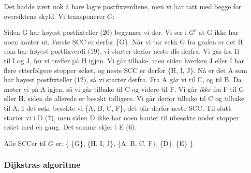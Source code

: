 \begin{example}
\noindent Det hadde vært nok å bare lagre postfixverdiene, men vi har tatt med begge for oversiktens skyld. Vi transponerer $ G $:

\begin{figure}[H]
\centering
{}
\end{figure}

Siden G har høyest postfixteller (20) begynner vi der. Vi ser i $ G^t $ at G ikke har noen kanter ut. Første SCC er derfor \{G\}. Når vi tar vekk G fra grafen er det H som har høyest postfixverdi (19), vi starter derfor neste dfs derfra. Vi går fra H til I og J, før vi treffer på H igjen. Vi går tilbake, men siden hverken J eller I har flere etterfølgere stopper søket, og neste SCC er derfor \{H, I, J\}. Nå er det A som har høyest postfixteller (12), så vi starter derfra. Fra A går vi til C, og til B. Da møter vi på A igjen, så vi går tilbake til C og videre til F. Vi går \emph{ikke} fra F til G eller H, siden de allerede er besøkt tidligere. Vi går derfor tilbake til C og tilbake til A. I det søke besøkte vi \{A, B, C, F\}, det blir derfor neste SCC. Til slutt starter vi i D (7), men siden D ikke har noen kanter til ubesøkte noder stopper søket med en gang. Det samme skjer i E (6). 

Alle SCCer til $ G $ er: \{ \{G\}, \{H, I, J\}, \{A, B, C, F\}, \{D\}, \{E\} \}
\end{example}


\subsubsection{Dijkstras algoritme}
\label{dijkstra}

